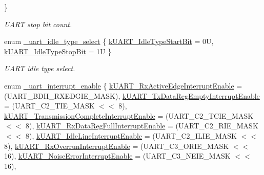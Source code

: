 \begin{DoxyCompactItemize}
 \}
\begin{DoxyCompactList}\small\item\em U\+A\+RT stop bit count. \end{DoxyCompactList}\item 
enum \mbox{\hyperlink{group__uart__driver_gae658ead369268edf18141e1903d426f1}{\+\_\+uart\+\_\+idle\+\_\+type\+\_\+select}} \{ \mbox{\hyperlink{group__uart__driver_ggae658ead369268edf18141e1903d426f1a5216f34232b8d01cdd8db1ca01072901}{k\+U\+A\+R\+T\+\_\+\+Idle\+Type\+Start\+Bit}} = 0U, 
\mbox{\hyperlink{group__uart__driver_ggae658ead369268edf18141e1903d426f1a05771d6cd97e160c6a47d5871d2de013}{k\+U\+A\+R\+T\+\_\+\+Idle\+Type\+Stop\+Bit}} = 1U
 \}
\begin{DoxyCompactList}\small\item\em U\+A\+RT idle type select. \end{DoxyCompactList}\item 
enum \mbox{\hyperlink{group__uart__driver_ga700f3cd8e3800273a1591307cab6311c}{\+\_\+uart\+\_\+interrupt\+\_\+enable}} \{ \newline
\mbox{\hyperlink{group__uart__driver_gga700f3cd8e3800273a1591307cab6311ca71755319c216d0bdf79729c18c24cf64}{k\+U\+A\+R\+T\+\_\+\+Rx\+Active\+Edge\+Interrupt\+Enable}} = (U\+A\+R\+T\+\_\+\+B\+D\+H\+\_\+\+R\+X\+E\+D\+G\+I\+E\+\_\+\+M\+A\+SK), 
\mbox{\hyperlink{group__uart__driver_gga700f3cd8e3800273a1591307cab6311ca5a0870233f2ffa8f5ca60d80f1e3ed14}{k\+U\+A\+R\+T\+\_\+\+Tx\+Data\+Reg\+Empty\+Interrupt\+Enable}} = (U\+A\+R\+T\+\_\+\+C2\+\_\+\+T\+I\+E\+\_\+\+M\+A\+SK $<$$<$ 8), 
\mbox{\hyperlink{group__uart__driver_gga700f3cd8e3800273a1591307cab6311cafd337213dae85b532dfaf9a90e2e5d7b}{k\+U\+A\+R\+T\+\_\+\+Transmission\+Complete\+Interrupt\+Enable}} = (U\+A\+R\+T\+\_\+\+C2\+\_\+\+T\+C\+I\+E\+\_\+\+M\+A\+SK $<$$<$ 8), 
\mbox{\hyperlink{group__uart__driver_gga700f3cd8e3800273a1591307cab6311cac8a751a334e172413ab833cb0ccb01c3}{k\+U\+A\+R\+T\+\_\+\+Rx\+Data\+Reg\+Full\+Interrupt\+Enable}} = (U\+A\+R\+T\+\_\+\+C2\+\_\+\+R\+I\+E\+\_\+\+M\+A\+SK $<$$<$ 8), 
\newline
\mbox{\hyperlink{group__uart__driver_gga700f3cd8e3800273a1591307cab6311ca078ea32d8587f92337a3dee495a1ceed}{k\+U\+A\+R\+T\+\_\+\+Idle\+Line\+Interrupt\+Enable}} = (U\+A\+R\+T\+\_\+\+C2\+\_\+\+I\+L\+I\+E\+\_\+\+M\+A\+SK $<$$<$ 8), 
\mbox{\hyperlink{group__uart__driver_gga700f3cd8e3800273a1591307cab6311ca3e85b14c1b64dbfef1d0b4b7bc39c19d}{k\+U\+A\+R\+T\+\_\+\+Rx\+Overrun\+Interrupt\+Enable}} = (U\+A\+R\+T\+\_\+\+C3\+\_\+\+O\+R\+I\+E\+\_\+\+M\+A\+SK $<$$<$ 16), 
\mbox{\hyperlink{group__uart__driver_gga700f3cd8e3800273a1591307cab6311ca53d0fe2bb0cd90198c632f08488af4b3}{k\+U\+A\+R\+T\+\_\+\+Noise\+Error\+Interrupt\+Enable}} = (U\+A\+R\+T\+\_\+\+C3\+\_\+\+N\+E\+I\+E\+\_\+\+M\+A\+SK $<$$<$ 16), 

\end{DoxyCompactItemize}
